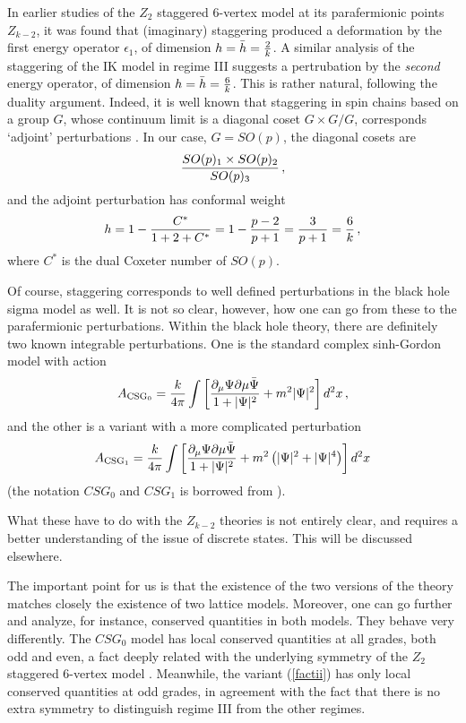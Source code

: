\documentclass[11pt]{article}
\begin{document}
In earlier studies \cite{JS_AFPotts} of the $Z_2$ staggered 6-vertex model at its parafermionic points $Z_{k-2}$, it was found that (imaginary) staggering produced a deformation by the first energy operator $\epsilon_1$, of dimension $h=\bar{h}={2\over k}$. A similar analysis of the staggering of the IK model in regime III suggests a pertrubation by the {\sl second} energy operator, of dimension $h=\bar{h}={6\over k}$. This is rather natural, following the duality argument. Indeed, 
it is well known that staggering in  spin chains based on a group $G$, whose continuum limit is a diagonal coset  $G\times G/G$, corresponds  `adjoint' perturbations \cite{ABL}.
In our case, $G=SO(p)$, the diagonal cosets are 
%
\begin{equation}
{SO(p)_1\times SO(p)_2\over SO(p)_3} \,,
\end{equation}
%
and the adjoint perturbation has conformal weight
%
\begin{equation}
h=1- {C^*\over 1+2+C^*}=1-{p-2\over p+1}={3\over p+1}={6\over k} \,,
\end{equation}
%
where $C^*$ is the dual Coxeter number of $SO(p)$. 

Of course, staggering corresponds to well defined perturbations in the black hole sigma model as well. It is not so clear, however, how one can go from these to the parafermionic perturbations. Within the black hole theory, there are definitely two known integrable perturbations\cite{BD85,Schiff,Fateevperso}. One is the standard complex sinh-Gordon model with action
%
\begin{equation}
A_{\rm CSG_0}={k\over 4\pi}\int \left[{\partial_\mu\Psi\partial\mu\bar{\Psi}\over 1+|\Psi|^2}+m^2|\Psi|^2\right]d^2x \,,
\label{facti}
\end{equation}
%
and the other is a variant with a more complicated perturbation
%
\begin{equation}
A_{\rm CSG_1}={k\over 4\pi}\int\left[{\partial_\mu\Psi\partial\mu\bar{\Psi}\over 1+|\Psi|^2}+m^2\left(|\Psi|^2+|\Psi|^4\right)\right]d^2x 
\label{factii}
\end{equation}
%
(the notation $CSG_0$ and $CSG_1$ is borrowed from \cite{BD85}). 



What these have to do with the $Z_{k-2}$ theories is not entirely clear, and requires a better understanding of the issue of discrete states. This will be discussed elsewhere. 

The important point for us is that the existence of the two versions of the theory matches closely the existence of two lattice models. Moreover, one can go further and analyze, for instance, conserved quantities in both models. They behave very differently. The $CSG_0$ model has local conserved quantities at all grades, both odd and even, a fact deeply related with the underlying symmetry of the $Z_2$ staggered 6-vertex model \cite{IkhlefJS1,IkhlefJS2,IkhlefJS3,CanduIkhlef}. Meanwhile, the variant (\ref{factii}) has only local conserved quantities at odd grades,  in agreement with the fact that there is no extra symmetry to distinguish regime III from the other regimes. 
\end{document}
